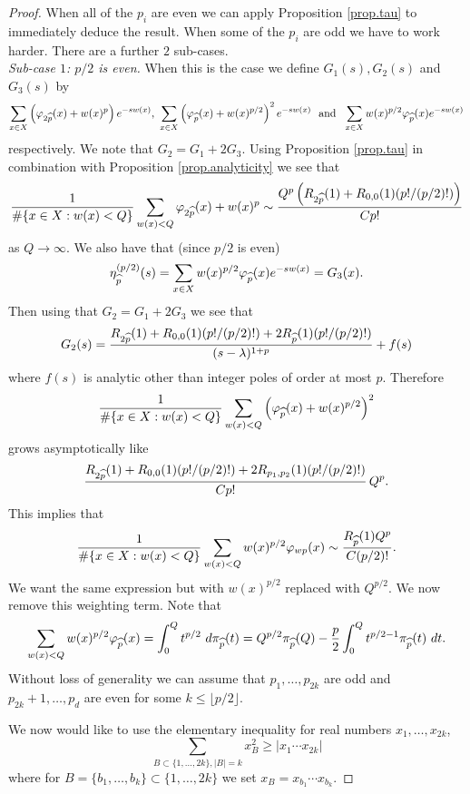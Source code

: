 \documentclass[12pt,a4paper,reqno]{amsart}
\begin{document}
\begin{proof}
When all of the $p_i$ are even we can apply Proposition \ref{prop.tau} to immediately deduce the result.
When some of the $p_i$ are odd we have to work harder. There are a further $2$ sub-cases. \\

\noindent 
\textit{Sub-case $1$: $p/2$ is even.} When this is the case we define $G_1(s), G_2(s)$ and $G_3(s)$ by 
\begin{align*}
 \sum_{x \in X} \left(\varphi_{2\widehat{p}}(x) + w(x)^p\right) e^{-sw(x)},  \  \sum_{x \in X} \left(\varphi_{\widehat{p}}(x)+ w(x)^{p/2}\right)^2 e^{-sw(x)} \ \text{ and } \ \sum_{x \in X} w(x)^{p/2} \varphi_{\widehat{p}}(x) e^{-sw(x)}
\end{align*}
respectively.
We note that $G_2 = G_1 + 2G_3$.
Using Proposition \ref{prop.tau} in combination with Proposition \ref{prop.analyticity} we see that
\[
\frac{1}{\#\{x \in X: w(x) < Q\}}\sum_{w(x) < Q} \varphi_{2\widehat{p}}(x) + w(x)^p \sim \frac{Q^p\left( R_{2\widehat{p}}(1) + R_{0,0}(1)(p!/(p/2)!)\right)}{Cp!}
\]
as $Q\to\infty$. We also have that (since $p/2$ is even)
\[
\eta_{\widehat{p}}^{(p/2)}(s) = \sum_{x \in X} w(x)^{p/2} \varphi_{\widehat{p}}(x)e^{-sw(x)} = G_3(x).
\]
Then using that $G_2 = G_1 + 2G_3$ we see that
\[
G_2(s) = \frac{R_{2\widehat{p}}(1) + R_{0,0}(1)(p!/(p/2)!) + 2 R_{\widehat{p}}(1)(p!/(p/2)!)}{(s-\lambda)^{1+p}} + f(s)
\]
where $f(s)$ is analytic other than integer poles of order at most $p$. Therefore
\[
\frac{1}{\#\{x \in X: w(x) < Q\}} \sum_{w(x) <Q} \left(\varphi_{\widehat{p}}(x)+ w(x)^{p/2}\right)^2 
\]
grows asymptotically like
\[
\frac{R_{2\widehat{p}}(1) + R_{0,0}(1)(p!/(p/2)!) + 2 R_{p_1,p_2}(1)(p!/(p/2)!)}{C p!} \, Q^p.
\]
This implies that
\[
\frac{1}{\#\{x \in X: w(x) < Q\}}\sum_{w(x) < Q} w(x)^{p/2} \varphi_{w{p}}(x)\sim \frac{R_{\widehat{p}}(1) Q^{p}}{C(p/2)!} .
\]
We want the same expression but with $w(x)^{p/2}$ replaced with $Q^{p/2}$. We now remove this weighting term. Note that
\[
\sum_{w(x) < Q} w(x)^{p/2} \varphi_{\widehat{p}}(x) = \int_0^Q t^{p/2} \ d\pi_{\widehat{p}}(t) = Q^{p/2}\pi_{\widehat{p}}(Q) - \frac{p}{2} \int_0^Q t^{p/2 -1} \pi_{\widehat{p}}(t) \ dt.	
\]
Without loss of generality we can assume that $p_1,\ldots,p_{2k}$ are odd and $p_{2k}+1, \ldots, p_d$ are even for some $k \le \lfloor p/2 \rfloor$.

We now would like to use the elementary inequality for real numbers $x_1,\ldots,x_{2k}$,
\[
\sum_{B \subset \{1,\ldots,2k\}, |B| = k} x_B^2 \ge |x_1 \cdots x_{2k}|
\]
where for $ B =\{b_1,\ldots, b_k\}  \subset \{1,\ldots,2k\}$ we set $x_B = x_{b_1}\cdots x_{b_k}$.


\end{proof}
\end{document}
